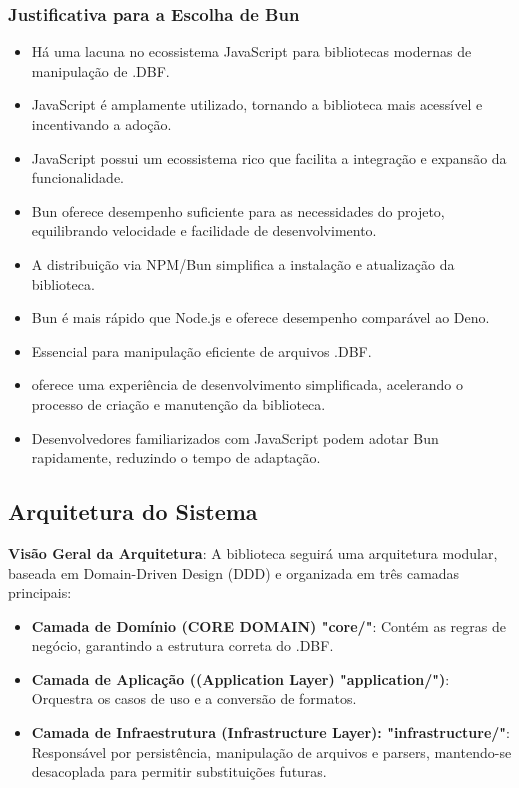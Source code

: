 \begin{titlepage}
    \subsubsection{Justificativa para a Escolha de Bun}
    \begin{itemize}
        \item Há uma lacuna no ecossistema JavaScript para bibliotecas modernas de
              manipulação de .DBF.
        \item JavaScript é amplamente utilizado, tornando a biblioteca mais acessível e
              incentivando a adoção.
        \item JavaScript possui um ecossistema rico que facilita a integração e expansão da
              funcionalidade.
        \item Bun oferece desempenho suficiente para as necessidades do projeto, equilibrando
              velocidade e facilidade de desenvolvimento.
        \item A distribuição via NPM/Bun simplifica a instalação e atualização da biblioteca.
        \item  Bun é mais rápido que Node.js e oferece desempenho comparável ao Deno.
        \item Essencial para manipulação eficiente de arquivos .DBF.
        \item oferece uma experiência de desenvolvimento simplificada, acelerando o processo
              de criação e manutenção da biblioteca.
        \item Desenvolvedores familiarizados com JavaScript podem adotar Bun rapidamente,
              reduzindo o tempo de adaptação.
    \end{itemize}

    \subsection{Arquitetura do Sistema}
    \textbf{Visão Geral da Arquitetura}:
    A biblioteca seguirá uma arquitetura modular, baseada em Domain-Driven Design (DDD) e organizada em três camadas principais:
    \begin{itemize}
        \item \textbf{Camada de Domínio (CORE DOMAIN) "core/"}: Contém as regras de negócio, garantindo a estrutura correta do .DBF.
        \item \textbf{Camada de Aplicação ((Application Layer) "application/")}: Orquestra os casos de uso e a conversão de formatos.
        \item \textbf{Camada de Infraestrutura (Infrastructure Layer): "infrastructure/"}: Responsável por persistência, manipulação de arquivos e parsers, mantendo-se desacoplada para permitir substituições futuras.
    \end{itemize}


\end{titlepage}
